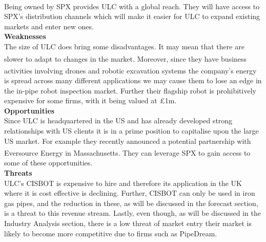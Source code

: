 \documentclass[11pt]{article}		%
\newcommand{\supercite}[1]{\textsuperscript{\cite{#1}}}		%
\begin{document}
	        \\
	        Being owned by SPX provides ULC with a global reach. They will have access to SPX's distribution channels which will make it easier for ULC to expand existing markets and enter new ones.
	        \\
	        \textbf{Weaknesses}
	        \\
	        The size of ULC does bring some disadvantages. It may mean that there are slower to adapt to changes in the market\supercite{ULC_Slow}. Moreover, since they have business activities involving drones and robotic excavation systems\supercite{ULC_news} the company's energy is spread across many different applications we may cause them to lose an edge in the in-pipe robot inspection market. Further their flagship robot is prohibitively expensive for some firms, with it being valued at £1m.
	        \\
	        \textbf{Opportunities}
	        \\
	        Since ULC is headquartered in the US and has already developed strong relationships with US clients it is in a prime position to capitalise upon the large US market. For example they recently announced a potential partnership with Eversource Energy in Massachusetts\supercite{ULC_news}. They can leverage SPX to gain access to some of these opportunities.
	        \\
	        \textbf{Threats}
	        \\
	        ULC's CISBOT is expensive to hire and therefore its application in the UK where it is cost effective is declining. Further, CISBOT can only be used in iron gas pipes, and the reduction in these, as will be discussed in the forecast section, is a threat to this revenue stream. Lastly, even though, as will be discussed in the Industry Analysis section, there is a low threat of market entry their market is likely to become more competitive due to firms such as PipeDream.
	        
	        
            
\end{document}
